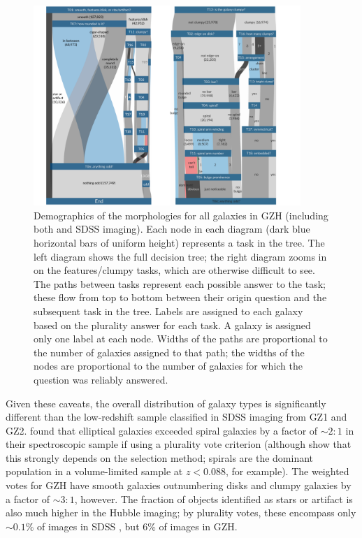\documentclass[twocolumn]{aastex6}
\begin{document}
\begin{figure}
\center
\includegraphics[width=0.90\textwidth]{figures/sankey_both.png}
\caption{Demographics of the morphologies for all galaxies in GZH (including
both \hst{} and SDSS imaging). Each node in each diagram (dark blue horizontal
bars of uniform height) represents a task in the tree. The left diagram shows
the full decision tree; the right diagram zooms in on the features/clumpy
tasks, which are otherwise difficult to see. The paths between tasks represent
each possible answer to the task; these flow from top to bottom between their
origin question and the subsequent task in the tree. Labels are assigned to
each galaxy based on the plurality answer for each task. A galaxy is assigned
only one label at each node. Widths of the paths are proportional to the number
of galaxies assigned to that path; the widths of the nodes are proportional to
the number of galaxies for which the question was reliably answered.}
\label{fig:sankey}
\end{figure}

Given these caveats, the overall distribution of galaxy types is significantly
different than the low-redshift sample classified in SDSS imaging from GZ1 and
GZ2. \citet{lin11} found that elliptical galaxies exceeded spiral galaxies by a
factor of $\sim2:1$ in their spectroscopic sample if using a plurality vote
criterion (although \citealt{bam09} show that this strongly depends on the
selection method; spirals are the dominant population in a volume-limited
sample at $z<0.088$, for example). The weighted votes for GZH have smooth
galaxies outnumbering disks and clumpy galaxies by a factor of $\sim3:1$,
however. The fraction of objects identified as stars or artifact is also much
higher in the Hubble imaging; by plurality votes, these encompass only
$\sim0.1\%$ of images in SDSS \citep{wil13}, but 6\% of images in GZH. 
\end{document}
